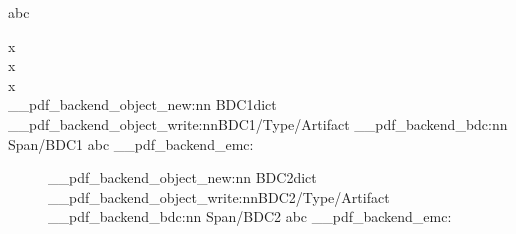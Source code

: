 \documentclass{article}
\begin{document}
abc

\vspace{44\baselineskip}

x\\x\\x\\
\ExplSyntaxOn
\__pdf_backend_object_new:nn  {BDC1}{dict}
\__pdf_backend_object_write:nn{BDC1}{/Type/Artifact}
\__pdf_backend_bdc:nn {Span}{/BDC1}
abc
\__pdf_backend_emc:
\ExplSyntaxOff

\begin{figure}[p]
\__pdf_backend_object_new:nn  {BDC2}{dict}
\__pdf_backend_object_write:nn{BDC2}{/Type/Artifact}
\__pdf_backend_bdc:nn {Span}{/BDC2}
abc
\__pdf_backend_emc:
\end{figure}
\end{document}
